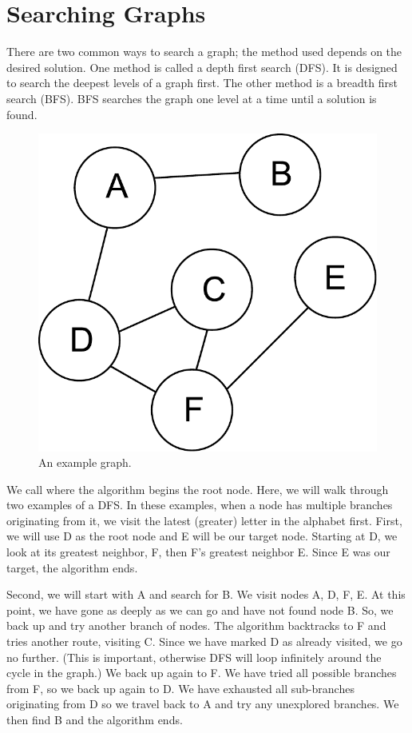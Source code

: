 \label{lab:SixDegreesKevinBacon}

\section*{Searching Graphs}
There are two common ways to search a graph;
the method used depends on the desired solution.
One method is called a depth first search (DFS).  It is designed to search the deepest levels of a graph first.
The other method is a breadth first search (BFS).  BFS searches the graph one level at a time until a solution is found.
\begin{figure}[h]
\centering
\includegraphics[width=.5\textwidth]{graph.pdf}
\caption{An example graph.}
\label{fig:bfs_dfs_graph}
\end{figure}

We call where the algorithm begins the root node.
Here, we will walk through two examples of a DFS.
In these examples, when a node has multiple branches originating from it, we visit the latest (greater) letter in the alphabet first.
First, we will use D as the root node and E will be our target node.
Starting at D, we look at its greatest neighbor, F, then F's greatest neighbor E.
Since E was our target, the algorithm ends.

Second, we will start with A and search for B.
We visit nodes A, D, F, E.
At this point, we have gone as deeply as we can go and have not found node B.
So, we back up and try another branch of nodes.
The algorithm backtracks to F and tries another route, visiting C.
Since we have marked D as already visited, we go no further.
(This is important, otherwise DFS will loop infinitely around the cycle in the graph.)
We back up again to F.  We have tried all possible branches from F, so we back up again to D.
We have exhausted all sub-branches originating from D so we travel back to A and try any unexplored branches.
We then find B and the algorithm ends.

